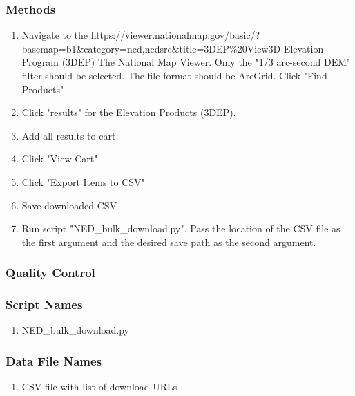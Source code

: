 \subsubsection*{Methods}
\begin{enumerate}
\item Navigate to the {https://viewer.nationalmap.gov/basic/?basemap=b1\&category=ned,nedsrc\&title=3DEP\%20View}{3D Elevation Program (3DEP) The National Map Viewer}. Only the "1/3 arc-second DEM" filter should be selected. The file format should be ArcGrid. Click "Find Products"
\item Click "results" for the Elevation Products (3DEP).
\item Add all results to cart
\item Click "View Cart"
\item Click "Export Items to CSV"
\item Save downloaded CSV
\item Run script "NED\_bulk\_download.py". Pass the location of the CSV file as the first argument and the desired save path as the second argument.
\end{enumerate}
\subsubsection*{Quality Control}
\subsubsection*{Script Names}
\begin{enumerate}
\item NED\_bulk\_download.py
\end{enumerate}
\subsubsection*{Data File Names}
\begin{enumerate}
\item CSV file with list of download URLs
\end{enumerate}